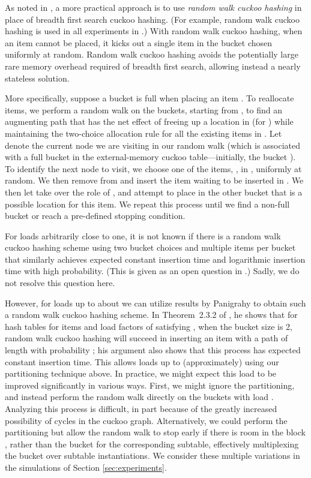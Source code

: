 \documentclass[11pt,letterpaper]{article}
\begin{document}
As noted in \cite{dw-badtpcs-07}, a more practical approach
is to use {\em random walk cuckoo hashing} in place of breadth first
search cuckoo hashing.  (For example, random walk cuckoo hashing is
used in all experiments in \cite{dw-badtpcs-07}.)  With
random walk cuckoo hashing, when an item cannot be placed, it kicks
out a single item in the bucket chosen uniformly at random.  Random
walk cuckoo hashing avoids the potentially large rare memory overhead
required of breadth first search, allowing instead a nearly stateless
solution.

More specifically, suppose a bucket  is full when placing an item
.  To reallocate items, we perform a random walk on the buckets,
starting from , to find an augmenting path that has the net effect
of freeing up a location in  (for ) while maintaining the
two-choice allocation rule for all the existing items in .  Let
 denote the current node we are visiting in our random walk (which
is associated with a full bucket in the external-memory cuckoo
table---initially, the bucket ).  To identify the next node to
visit, we choose one of the items, , in , uniformly at
random.  We then remove  from  and insert the item  waiting
to be inserted in .  We then let  take over the role of , and
attempt to place  in the other bucket that is a possible
location for this item.  We repeat this process until we find a
non-full bucket or reach a pre-defined stopping condition.

For loads arbitrarily close to one, it is not known if there is a random walk cuckoo hashing scheme using
two bucket choices and
multiple items per bucket that similarly achieves expected constant
insertion time and logarithmic insertion time with high probability.
(This is given as an open question in \cite{dw-badtpcs-07}.)
Sadly, we do not resolve this question here.

However, for loads up to about  we can utilize results by Panigrahy \cite{p-ehltma,p-hss-06} to
obtain such a random
walk cuckoo hashing scheme.  In Theorem~{2.3.2} of \cite{p-hss-06}, he
shows that for hash tables for  items and load factors of 
satisfying , when the bucket size is 2, random
walk cuckoo hashing will succeed in inserting an item with a path
of length  with probability ; his argument also
shows that this process has expected constant insertion time.  This
allows loads up to (approximately)  using our partitioning technique
above.  In practice, we might expect this load to be improved
significantly in various ways.  First, we might ignore the partitioning,
and instead perform the random walk directly on the buckets with load
.  Analyzing this process is difficult, in part
because of the greatly increased possibility of cycles in the cuckoo
graph.  Alternatively, we could perform the partitioning but allow the
random walk to stop early if there is room in the block , rather
than the bucket for the corresponding subtable, effectively
multiplexing the bucket over subtable instantiations. We consider
these multiple variations in the simulations of Section \ref{sec:experiments}.
\end{document}
